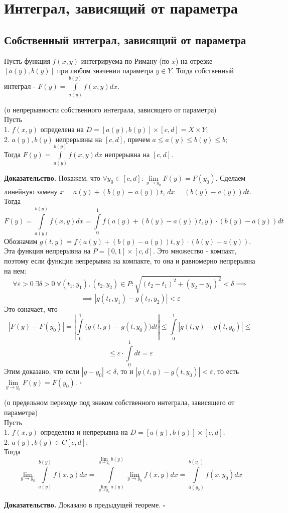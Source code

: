 \chapter{Интеграл, зависящий от параметра}
\section{Собственный интеграл, зависящий от параметра}
\begin{defin}
    Пусть функция $f(x,y)$ интегрируема по Риману (по $x$) 
    на отрезке $[a(y),b(y)]$
    при любом значении параметра  $y\in Y$. Тогда собственный интеграл - 
    $F(y)=\int\limits_{a(y)}^{b(y)}f(x,y)dx$.
\end{defin}

\begin{theor}
    (о непрерывности собственного интеграла, зависящего от параметра)\\
    Пусть\\
    1. $f(x,y)$ определена на  $D=[a(y),b(y)]\times [c,d]=X\times Y$;\\
    2. $a(y),b(y)$ непрерывны на  $[c,d]$, причем
    $a\leqslant a(y)\leqslant b(y)\leqslant b$;\\
    Тогда $F(y)=\int\limits_{a(y)}^{b(y)}f(x,y)dx$ непрерывна на $[c,d]$.
\end{theor}
\textbf{Доказательство.} Покажем, что $\forall y_0\in [c,d]:
\lim\limits_{y \to y_0}F(y)=F(y_0)$. Сделаем линейную замену
$x=a(y)+(b(y)-a(y))t$, $dx=(b(y)-a(y))dt$. Тогда
$$F(y)=\int\limits_{a(y)}^{b(y)}f(x,y)dx=\int\limits_{0}^{1}
f(a(y)+(b(y)-a(y))t,y)\cdot (b(y)-a(y))dt$$
Обозначим $g(t,y)=f(a(y)+(b(y)-a(y))t,y)\cdot (b(y)-a(y))$. Эта функция 
непрерывна на $P=[0,1]\times [c,d]$. Это множество - компакт, поэтому если 
функция непрерывна на компакте, то она и равномерно непрерывна на нем:
$$\forall \varepsilon>0~\exists \delta>0~\forall (t_1,y_1),(t_2,y_2)\in P:
\sqrt{(t_2-t_1)^2+(y_2-y_1)^2}<\delta\implies $$
$$\implies |g(t_1,y_1)-g(t_2,y_2)|<\varepsilon$$ 
Это означает, что
$$|F(y)-F(y_0)|=\left| \int\limits_{0}^{1}\big(g(t,y)-g(t,y_0)\big)dt\right|
\leqslant \int\limits_{0}^{1}|g(t,y)-g(t,y_0)|\leqslant 
$$
$$\leqslant \varepsilon\cdot \int\limits_{0}^{1}dt=\varepsilon$$
Этим доказано, что если $|y-y_0|<\delta$, то и $|g(t,y)-g(t,y_0)|<
\varepsilon$, то есть $\lim\limits_{y \to y_0}F(y)=F(y_0)$. $\square$ 

\begin{theor}
    (о предельном переходе под знаком собственного интеграла, зависящего от 
    параметра)\\
    Пусть\\
    1. $f(x,y)$ определена и непрерывна на  $D=[a(y),b(y)]\times [c,d]$;\\
    2. $a(y),b(y)\in C[c,d]$;\\
    Тогда 
    $$\lim\limits_{y \to y_0}\int\limits_{a(y)}^{b(y)}f(x,y)dx=
    \int\limits_{\lim\limits_{y \to y_0}a(y) }^{\lim\limits_{y \to y_0}b(y)}
   \lim\limits_{y \to y_0}f(x,y)dx=\int\limits_{a(y_0)}^{b(y_0)}f(x,y_0)dx$$
\end{theor}
\textbf{Доказательство.}  Доказано в предыдущей теореме. $\square$

